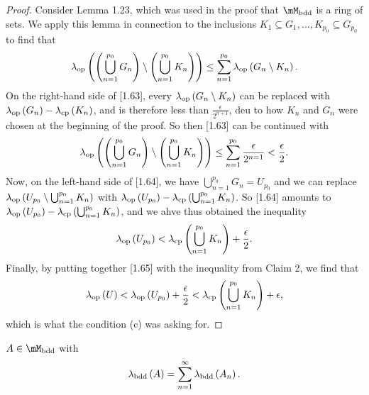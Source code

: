 \documentclass[pmath450]{subfiles}
\begin{document}
\begin{proof}
        Consider Lemma 1.23, which was used in the proof that $\mM_{\bdd}$ is a ring of sets. We apply this lemma in connection to the inclusions $K_1\subseteq G_1,\ldots,K_{p_0}\subseteq G_{p_0}$ to find that
        \begin{equation}
            \lambda_{\operatorname{op}}\left( \left( \bigcup^{p_0}_{n=1}G_n \right)\setminus\left( \bigcup^{p_0}_{n=1}K_n \right) \right)\leq \sum^{p_0}_{n=1} \lambda_{\operatorname{op}}\left( G_n\setminus K_n \right).
        \end{equation}
        On the right-hand side of [1.63], every $\lambda_{\operatorname{op}}\left( G_n\setminus K_n \right)$ can be replaced with $\lambda_{\operatorname{op}}\left( G_n \right)-\lambda_{\operatorname{cp}}\left( K_n \right)$, and is therefore less than $\frac{\epsilon}{2^{n+1}}$, deu to how $K_n$ and $G_n$ were chosen at the beginning of the proof. So then [1.63] can be continued with
        \begin{equation}
            \lambda_{\operatorname{op}}\left( \left( \bigcup^{p_0}_{n=1}G_n \right)\setminus\left( \bigcup^{p_0}_{n=1}K_n \right) \right)\leq \sum^{p_0}_{n=1} \frac{\epsilon}{2^{n=1}} < \frac{\epsilon}{2}.
        \end{equation}
        Now, on the left-hand side of [1.64], we have $\bigcup^{p_0}_{n=1}G_n = U_{p_0}$ and we can replace $\lambda_{\operatorname{op}}\left( U_{p_0}\setminus \bigcup^{p_0}_{n=1}K_n \right)$ with $\lambda_{\operatorname{op}}\left( U_{p_0} \right)-\lambda_{\operatorname{cp}}\left( \bigcup^{p_0}_{n=1}K_n \right)$. So [1.64] amounts to $\lambda_{\operatorname{op}}\left( U_{p_0} \right)-\lambda_{\operatorname{cp}}\left( \bigcup^{p_0}_{n=1}K_n \right)$, and we ahve thus obtained the inequality
        \begin{equation}
            \lambda_{\operatorname{op}}\left( U_{p_0} \right) < \lambda_{\operatorname{cp}}\left( \bigcup^{p_0}_{n=1}K_n \right)+\frac{\epsilon}{2}.
        \end{equation}
        Finally, by putting together [1.65] with the inequality from Claim 2, we find that
        \begin{equation*}
            \lambda_{\operatorname{op}}\left( U \right)<\lambda_{\operatorname{op}}\left( U_{p_0} \right)+\frac{\epsilon}{2}<\lambda_{\operatorname{cp}}\left( \bigcup^{p_0}_{n=1}K_n \right)+\epsilon,
        \end{equation*}
        which is what the condition (c) was asking for.
    \end{proof}

    \begin{prop}{}
        $A\in\mM_{\bdd}$ with
        \begin{equation*}
            \lambda_{\operatorname{bdd}}\left( A \right)=\sum^{\infty}_{n=1}\lambda_{\operatorname{bdd}}\left( A_n \right).
        \end{equation*}
    \end{prop}
\end{document}
